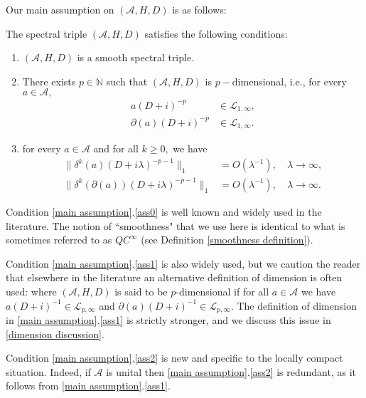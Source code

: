     Our main assumption on $(\mathcal{A},H,D)$ is as follows:
    \begin{hyp}\label{main assumption} 
        The spectral triple $(\mathcal{A},H,D)$ satisfies the following conditions:
        \begin{enumerate}[{\rm (i)}]
            \item\label{ass0} $(\mathcal{A},H,D)$ is a smooth spectral triple.
            \item\label{ass1} There exists $p \in \mathbb{N}$ such that $(\mathcal{A},H,D)$ is $p-$dimensional, i.e., for every $a\in\mathcal{A},$
                \begin{align*}
                              a(D+i)^{-p} &\in\mathcal{L}_{1,\infty},\\
                    \partial(a)(D+i)^{-p} &\in\mathcal{L}_{1,\infty}.
                \end{align*}
            \item\label{ass2} for every $a\in\mathcal{A}$ and for all $k\geq0,$ we have
                \begin{align*}
                              \Big\|\delta^k(a)(D+i\lambda)^{-p-1}\Big\|_1 &= O(\lambda^{-1}),\quad\lambda\to\infty,\\
                    \Big\|\delta^k(\partial(a))(D+i\lambda)^{-p-1}\Big\|_1 &= O(\lambda^{-1}),\quad\lambda\to\infty.
                \end{align*}
        \end{enumerate}
    \end{hyp}
    Condition \ref{main assumption}.\eqref{ass0} is well known and widely used in the literature. The notion of ``smoothness" that we use here
    is identical to what is sometimes referred to as $QC^\infty$ (see Definition \ref{smoothness definition}).
    
    Condition \ref{main assumption}.\eqref{ass1} is also widely used, but we caution the reader that elsewhere in the literature an alternative definition
    of dimension is often used: where $(\mathcal{A},H,D)$ is said to be $p$-dimensional if for all $a \in \mathcal{A}$ we have $a(D+i)^{-1} \in \mathcal{L}_{p,\infty}$
    and $\partial(a)(D+i)^{-1} \in \mathcal{L}_{p,\infty}$. {  The definition of dimension in \ref{main assumption}.\eqref{ass1} is strictly stronger, and we discuss this issue in \ref{dimension discussion}.}
    
    Condition \ref{main assumption}.\eqref{ass2} is new and specific to the locally compact situation.
    Indeed, if $\mathcal{A}$ is unital then \ref{main assumption}.\eqref{ass2} is redundant, as it follows from \ref{main assumption}.\eqref{ass1}. 
    
